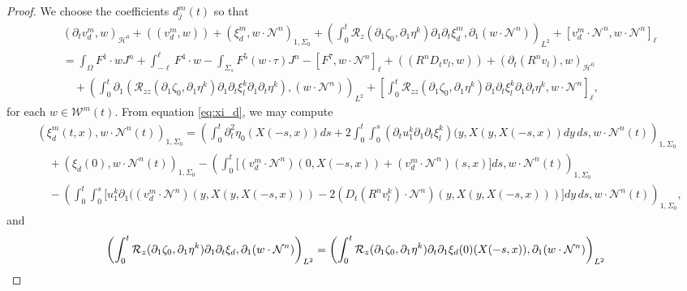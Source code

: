 \documentclass[letterpaper,reqno,10pt,twoside]{amsart}
\theoremstyle{definition}
\theoremstyle{remark}
\def\p{\partial}
\def\Om{\Omega}
\begin{document}
\begin{proof}
		We choose the coefficients $d^m_j(t)$ so that
		\begin{equation}
			\begin{aligned}
				&(\p_tv_{d}^m,w)_{\mathcal{H}^0}+((v_{d}^m,w))+(\xi_{d}^m,w\cdot\mathcal{N}^{n})_{1,\Sigma_{0}}+(\int_{0}^{t}\mathcal{R}_{z}(\partial_{1}\zeta_{0},\partial_{1}\eta^{k})\partial_{1}\partial_{t}\xi_{d}^{m},\partial_{1}(w\cdot\mathcal{N}^{n}))_{L^{2}}+[v_{d}^{m}\cdot \mathcal{N}^{n},w\cdot\mathcal{N}^{n}]_{\ell}\\&
				=\int_{\Om}F^1\cdot wJ^{n}+\int_{-\ell}^{\ell}F^4\cdot w-\int_{\Sigma_s}F^5(w\cdot\tau)J^{n}-[F^7,w\cdot\mathcal{N}^{n}]_\ell+((R^{n}D_{t}v_{l},w))+(\p_{t}(R^{n}v_{l}),w)_{\mathcal{H}^{0}}\\
				&\quad+ \left(\int_{0}^{t}\p_{1}(\mathcal{R}_{zz}(\p_{1}\zeta_{0},\p_{1}\eta^{k})\p_{1}\p_{t}\xi_{l}^{k}\p_{1}\p_{t}\eta^{k}),(w\cdot \mathcal{N}^{n})\right)_{L^{2}}+[\int_{0}^{t}\mathcal{R}_{zz}(\p_{1}\zeta_{0},\p_{1}\eta^{k})\p_{1}\p_{t}\xi_{l}^{k}\p_{1}\p_{t}\eta^{k},w\cdot \mathcal{N}^{n}]_{\ell},\label{eq:galerkin}
			\end{aligned}
		\end{equation}
		for each $w\in \mathcal{W}^m(t)$.
		From equation \eqref{eq:xi_d}, we may compute
		\[\begin{aligned}
			&(\xi_{d}^m(t,x),w\cdot\mathcal{N}^{n}(t))_{1,\Sigma_{0}}
			= \left(\int_{0}^{t}\partial_{t}^{2}\eta_{0}(X(-s,x))ds+2\int_{0}^{t}\int_{0}^{s}(\partial_{t}u_{1}^{k}\partial_{1}\partial_{t}\xi_{l}^{k})(y,X(y,X(-s,x))dy\,ds,w\cdot\mathcal{N}^{n}(t) \right)_{1,\Sigma_{0}}\\
			&\quad+(\xi_{d}(0),w\cdot\mathcal{N}^{n}(t) )_{1,\Sigma_{0}}-\left(\int_{0}^{t}\Big[(v_{d}^{m}\cdot \mathcal{N}^{n})(0,X(-s,x)) + (v_{d}^{m}\cdot \mathcal{N}^{n})(s,x) \Big]ds,w\cdot \mathcal{N}^{n}(t) \right)_{1,\Sigma_{0}}\\&\quad-\left(\int_{0}^{t}\int_{0}^{s}\Big[u_{1}^{k}\partial_{1}((v_{d}^{m}\cdot \mathcal{N}^{n})(y,X(y,X(-s,x))) -2 (D_{t}(R^{n}v_{l}^{k})\cdot \mathcal{N}^{n})(y,X(y,X(-s,x)))\Big]dy\,ds, w\cdot\mathcal{N}^{n}(t) \right)_{1,\Sigma_{0}},
		\end{aligned}
		\]
		\noindent and
		\[\begin{aligned}
			&\left (\int_{0}^{t}\mathcal{R}_{z}(\partial_{1}\zeta_{0},\partial_{1}\eta^{k})\partial_{1}\partial_{t}\xi_{d},\partial_{1}(w\cdot\mathcal{N}^{n})\right)_{L^{2}}=\left(\int_{0}^{t}\mathcal{R}_{z}(\partial_{1}\zeta_{0},\partial_{1}\eta^{k})\partial_{t}\partial_{1}\xi_{d}(0)(X(-s,x)),\partial_{1}(w \cdot \mathcal{N}^{n}) \right)_{L^{2}}\notag\\

\end{aligned}\]
\end{proof}
\end{document}
